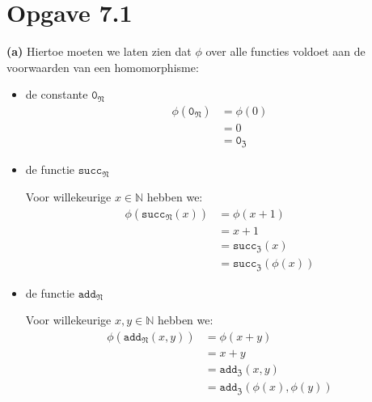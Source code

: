 \documentclass[a4paper,11pt]{article}
\begin{document}


\section*{Opgave 7.1}

\begin{description}

\item{\bf (a)}
Hiertoe moeten we laten zien dat $\phi$ over alle functies voldoet aan de
voorwaarden van een homomorphisme:

\begin{itemize}

\item{de constante $\texttt{0}_{\mathfrak{N}}$}
  \begin{align*}
    \phi(\texttt{0}_{\mathfrak{N}}) &= \phi(0) \\
                                    &= 0 \\
                                    &= \texttt{0}_{\mathfrak{Z}}
  \end{align*}

\item{de functie $\texttt{succ}_{\mathfrak{N}}$}

  Voor willekeurige $x \in \mathbb{N}$ hebben we:
  \begin{align*}
    \phi(\texttt{succ}_{\mathfrak{N}}(x)) &= \phi(x+1) \\
                                          &= x+1 \\
                                          &= \texttt{succ}_{\mathfrak{Z}}(x) \\
                                          &= \texttt{succ}_{\mathfrak{Z}}(\phi(x))
  \end{align*}

\item{de functie $\texttt{add}_{\mathfrak{N}}$}

  Voor willekeurige $x,y \in \mathbb{N}$ hebben we:
  \begin{align*}
    \phi(\texttt{add}_{\mathfrak{N}}(x,y)) &= \phi(x+y) \\
                                           &= x+y \\
                                           &= \texttt{add}_{\mathfrak{Z}}(x,y) \\
                                           &= \texttt{add}_{\mathfrak{Z}}(\phi(x),\phi(y))
  \end{align*}


\end{itemize}
\end{description}
\end{document}
